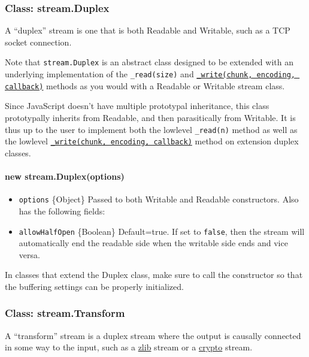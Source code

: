\subsubsection{Class: stream.Duplex}\label{class-stream.duplex-1}

A ``duplex'' stream is one that is both Readable and Writable, such as a
TCP socket connection.

Note that \texttt{stream.Duplex} is an abstract class designed to be
extended with an underlying implementation of the \texttt{\_read(size)}
and
\hyperref[streamux5fwritableux5fwriteux5fchunkux5fencodingux5fcallbackux5f1]{\texttt{\_write(chunk, encoding, callback)}}
methods as you would with a Readable or Writable stream class.

Since JavaScript doesn't have multiple prototypal inheritance, this
class prototypally inherits from Readable, and then parasitically from
Writable. It is thus up to the user to implement both the lowlevel
\texttt{\_read(n)} method as well as the lowlevel
\hyperref[streamux5fwritableux5fwriteux5fchunkux5fencodingux5fcallbackux5f1]{\texttt{\_write(chunk, encoding, callback)}}
method on extension duplex classes.

\paragraph{new stream.Duplex(options)}\label{new-stream.duplexoptions}

\begin{itemize}
\itemsep1pt\parskip0pt
\item
  \texttt{options} \{Object\} Passed to both Writable and Readable
  constructors. Also has the following fields:
\item
  \texttt{allowHalfOpen} \{Boolean\} Default=true. If set to
  \texttt{false}, then the stream will automatically end the readable
  side when the writable side ends and vice versa.
\end{itemize}

In classes that extend the Duplex class, make sure to call the
constructor so that the buffering settings can be properly initialized.

\subsubsection{Class: stream.Transform}\label{class-stream.transform-1}

A ``transform'' stream is a duplex stream where the output is causally
connected in some way to the input, such as a \href{zlib.html}{zlib}
stream or a \href{crypto.html}{crypto} stream.

